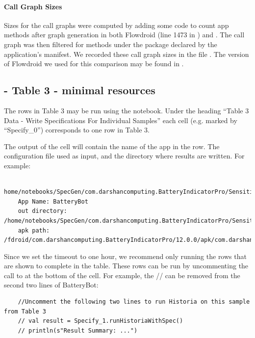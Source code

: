 \documentclass{article} %
\begin{document}
\paragraph{Call Graph Sizes} Sizes for the call graphs were computed by adding some code to count app methods after graph generation in both Flowdroid (line 1473 in ) and \toolname.  The call graph was then filtered for methods under the package declared by the application's manifest.  We recorded these call graph sizes in the file .
The version of Flowdroid we used for this comparison may be found in .  

\subsection{ - Table 3 - minimal resources}

The rows in Table 3 may be run using the  notebook.
Under the heading ``Table 3 Data - Write Specifications For Individual Samples'' each cell (e.g. marked by ``Specify\_0'') corresponds to one row in Table 3.

The output of the cell will contain the name of the app in the row. The configuration file used as input, and the directory where results are written.  For example:

\begin{lstlisting}
    home/notebooks/SpecGen/com.darshancomputing.BatteryIndicatorPro/SensitiveDerefCallinCaused/0/config.json
    App Name: BatteryBot
    out directory: /home/notebooks/SpecGen/com.darshancomputing.BatteryIndicatorPro/SensitiveDerefCallinCaused/0
    apk path: /fdroid/com.darshancomputing.BatteryIndicatorPro/12.0.0/apk/com.darshancomputing.BatteryIndicatorPro\_26016.apk
\end{lstlisting}

Since we set the timeout to one hour, we recommend only running the rows that are shown to complete in the table.  These rows can be run by uncommenting the call to  at the bottom of the cell.  For example, the // can be removed from the second two lines of BatteryBot:

\begin{lstlisting}
    //Uncomment the following two lines to run Historia on this sample from Table 3
    // val result = Specify_1.runHistoriaWithSpec()
    // println(s"Result Summary: ...")
\end{lstlisting}
\end{document}
